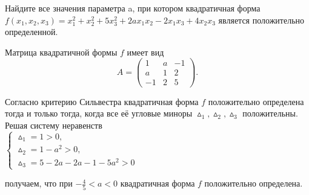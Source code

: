 \documentclass[addpoints, answers]{exam} %
\begin{document}
\begin{questions}

\question	Найдите все значения параметра a, при котором квадратичная форма\\  $f (x_1, x_2, x_3)=x_1^2+x_2^2+5x_3^2+2ax_1x_2-2x_1x_3+4x_2x_3$
является положительно определенной.

\begin{solution}
Матрица квадратичной формы  $f$ имеет вид\\
\[
 A=\left(\begin{array}{ccc}
1 & a & -1\\
a & 1 & 2\\
-1 & 2 & 5
\end{array}\right).
\]

Согласно критерию Сильвестра квадратичная форма  $f$ положительно определена тогда и только тогда, когда все её угловые миноры  $\vartriangle_1,\vartriangle_2,\vartriangle_3$   положительны. Решая систему неравенств\\
$
\begin{cases}
\vartriangle_1=1>0,\\
\vartriangle_2=1-a^2>0,\\
\vartriangle_3=5-2a-2a-1-5a^2>0
\end{cases}
$

получаем, что при $-\frac45<a<0$  квадратичная форма  $f$ положительно определена.


\end{solution}
\end{questions}
\end{document}

